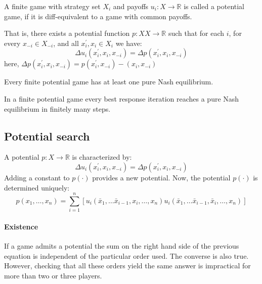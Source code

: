 \begin{definition}
    A finite game with strategy set $X_i$ and payoffs $u_i:X\rightarrow\mathbb{R}$ is called a potential game, if it is diff-equivalent to a game with common payoffs. 

    That is, there exists a potential function $p:XX\rightarrow \mathbb{R}$ such that for each $i$, for every $x_{-i}\in X_{-i}$, and all $x_i^\prime,x_i\in X_i$ we have: 
    \[\Delta u_i(x_i^\prime,x_i,x_{-i})=\Delta p(x_i^\prime,x_i,x_{-i})\]
    here, $\Delta p(x_i^\prime,x_i,x_{-i})=p(x_i^\prime,x_{-i})-(x_i,x_{-i})$
\end{definition}
\begin{corollary}
    Every finite potential game has at least one pure Nash equilibrium. 
\end{corollary}
\begin{corollary}
    In a finite potential game every best response iteration reaches a pure Nash equilibrium in finitely many steps. 
\end{corollary}

\subsection{Potential search}
A potential $p:X\rightarrow\mathbb{R}$ is characterized by: 
\[\Delta u_i(x_i^\prime,x_i,x_{-i})=\Delta p(x_i^\prime,x_i,x_{-i})\]
\noindent Adding a constant to $p(\cdot)$ provides a new potential. 
Now, the potential $p(\cdot)$ is determined uniquely: 
\[p(x_1,\dots,x_n)=\sum_{i=1}^{n}\left[u_i(\bar{x}_1,\dots\bar{x}_{i-1},x_i,\dots,x_n)u_i(\bar{x}_1,\dots\bar{x}_{i-1},\bar{x}_i,\dots,x_n)\right]\]

\paragraph*{Existence}
If a game admits a potential the sum on the right hand side of the previous equation is independent of the particular order used. 
The converse is also true. 
However, checking that all these orders yield the same answer is impractical for more than two or three players. 